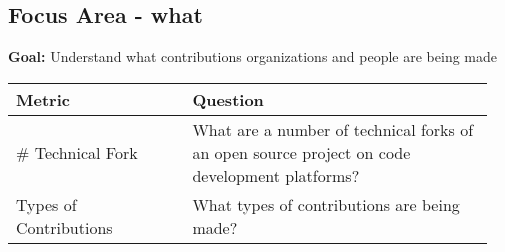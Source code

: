 
\subsection{Focus Area - what}
\textbf{Goal:} Understand what contributions organizations and people are being made
\begin{table}[ht!]
    \centering
    \begin{tabular}{|p{0.35\linewidth} | p{0.6\linewidth}|}
        \hline
        \hfil \textbf{Metric}  & \hfil \textbf{Question} \\
        \hline
		# Technical Fork & What are a number of technical forks of an open source project on code development platforms? \\ 
		\hline
		Types of Contributions & What types of contributions are being made? \\ 
		\hline
    \end{tabular}
\end{table}
